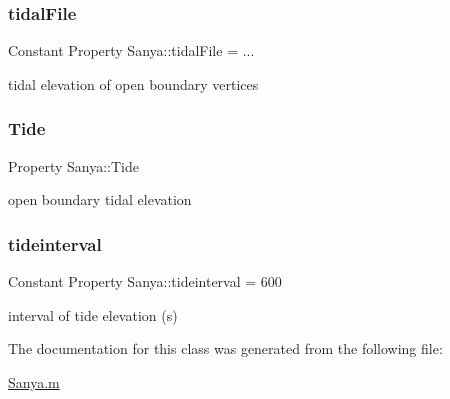 \subsubsection{\texorpdfstring{tidal\+File}{tidalFile}}
{\footnotesize\ttfamily Constant Property Sanya\+::tidal\+File = ...}



tidal elevation of open boundary vertices 

\mbox{\label{class_sanya_a90a8db1cd3e1c55054e6c739361a8511}} 
\subsubsection{\texorpdfstring{Tide}{Tide}}
{\footnotesize\ttfamily Property Sanya\+::\+Tide}



open boundary tidal elevation 

\mbox{\label{class_sanya_a55795de68414b87102507f87e6ad6af0}} 
\subsubsection{\texorpdfstring{tideinterval}{tideinterval}}
{\footnotesize\ttfamily Constant Property Sanya\+::tideinterval = 600}



interval of tide elevation (s) 



The documentation for this class was generated from the following file\+:\begin{DoxyCompactItemize}
\item 
\hyperlink{_sanya_8m}{Sanya.\+m}\end{DoxyCompactItemize}
